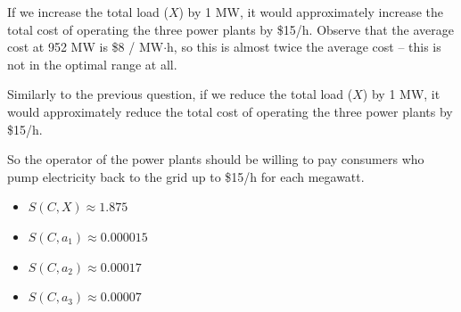 \begin{solution}
\begin{slide}
\begin{parts}
		\item If we increase the total load ($X$) by 1 MW, it would approximately increase the total cost of operating the three power plants by \$15/h. Observe that the average cost at 952 MW is \$8 / MW$\cdot$h, so this is almost twice the average cost -- this is not in the optimal range at all.

		\item Similarly to the previous question, if we reduce the total load ($X$) by 1 MW, it would approximately reduce the total cost of operating the three power plants by \$15/h.
		
		So the operator of the power plants should be willing to pay consumers who pump electricity back to the grid up to \$15/h for each megawatt.

		\item 	\begin{itemize}
			\item $S(C,X) \approx 1.875$
			\item $S(C,a_1) \approx 0.000015$
			\item $S(C,a_2) \approx 0.00017$
			\item $S(C,a_3) \approx 0.00007$
		\end{itemize}


	
\end{parts}
	
\end{slide}
	
\end{solution}


